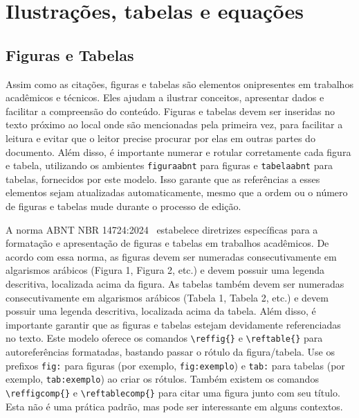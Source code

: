 \chapter{Ilustrações, tabelas e equações}\label{cap:ilustracoes}

\section{Figuras e Tabelas}\label{sec:figuras-tabelas}

Assim como as citações, figuras e tabelas são elementos onipresentes em trabalhos acadêmicos e
técnicos. Eles ajudam a ilustrar conceitos, apresentar dados e facilitar a compreensão do conteúdo.
Figuras e tabelas devem ser inseridas no texto próximo ao local onde são mencionadas pela primeira
vez, para facilitar a leitura e evitar que o leitor precise procurar por elas em outras partes do
documento. Além disso, é importante numerar e rotular corretamente cada figura e tabela, utilizando
os ambientes \texttt{figuraabnt} para figuras e \texttt{tabelaabnt} para tabelas, fornecidos por este
modelo. Isso garante que as referências a esses elementos sejam atualizadas automaticamente, mesmo
que a ordem ou o número de figuras e tabelas mude durante o processo de edição.

A norma ABNT NBR 14724:2024~\cite{nbr14724:2024} estabelece diretrizes específicas para a
formatação e apresentação de figuras e tabelas em trabalhos acadêmicos. De acordo com essa norma,
as figuras devem ser numeradas consecutivamente em algarismos arábicos (Figura 1, Figura 2, etc.) e
devem possuir uma legenda descritiva, localizada acima da figura. As tabelas também devem ser
numeradas consecutivamente em algarismos arábicos (Tabela 1, Tabela 2, etc.) e devem possuir uma
legenda descritiva, localizada acima da tabela. Além disso, é importante garantir que as figuras e
tabelas estejam devidamente referenciadas no texto. Este modelo oferece os comandos
\verb|\reffig{}| e \verb|\reftable{}| para autoreferências formatadas, bastando passar o rótulo da figura/tabela. Use os prefixos \texttt{fig:} para figuras (por exemplo, \texttt{fig:exemplo})
e \texttt{tab:} para tabelas (por exemplo, \texttt{tab:exemplo}) ao criar os rótulos. Também existem
os comandos \verb|\reffigcomp{}| e \verb|\reftablecomp{}| para citar uma figura junto com seu título. Esta não é uma prática padrão, mas pode ser interessante em alguns contextos.

